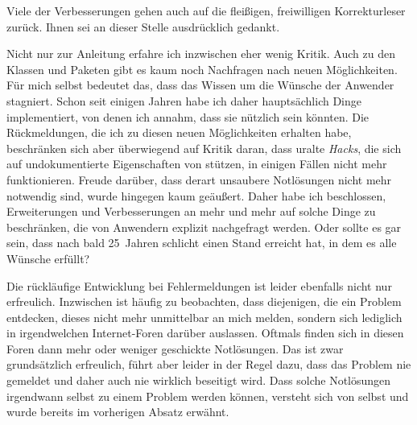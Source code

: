Viele der Verbesserungen gehen auch auf die fleißigen, freiwilligen
Korrekturleser zurück. Ihnen sei an dieser Stelle ausdrücklich gedankt.


Nicht nur zur Anleitung erfahre ich inzwischen eher wenig Kritik. Auch zu den
Klassen und Paketen gibt es kaum noch Nachfragen nach neuen Möglichkeiten. Für
mich selbst bedeutet das, dass das Wissen um die Wünsche der Anwender
stagniert. Schon seit einigen Jahren habe ich daher hauptsächlich Dinge
implementiert, von denen ich annahm, dass sie nützlich sein könnten. Die
Rückmeldungen, die ich zu diesen neuen Möglichkeiten erhalten habe,
beschränken sich aber überwiegend auf Kritik daran, dass uralte \emph{Hacks},
die sich auf undokumentierte Eigenschaften von \KOMAScript{} stützen, in
einigen Fällen nicht mehr funktionieren. Freude darüber, dass derart unsaubere
Notlösungen nicht mehr notwendig sind, wurde hingegen kaum geäußert. Daher
habe ich beschlossen, Erweiterungen und Verbesserungen an \KOMAScript{} mehr
und mehr auf solche Dinge zu beschränken, die von Anwendern explizit
nachgefragt werden. Oder sollte es gar sein, dass \KOMAScript{} nach bald
25~Jahren schlicht einen Stand erreicht hat, in dem es alle Wünsche erfüllt?

Die rückläufige Entwicklung bei Fehlermeldungen ist leider ebenfalls nicht nur
erfreulich. Inzwischen ist häufig zu beobachten, dass diejenigen, die ein
Problem entdecken, dieses nicht mehr unmittelbar an mich melden, sondern sich
lediglich in irgendwelchen Internet-Foren darüber auslassen. Oftmals finden
sich in diesen Foren dann mehr oder weniger geschickte Notlösungen. Das ist
zwar grundsätzlich erfreulich, führt aber leider in der Regel dazu, dass das
Problem nie gemeldet und daher auch nie wirklich beseitigt wird. Dass solche
Notlösungen irgendwann selbst zu einem Problem werden können, versteht sich
von selbst und wurde bereits im vorherigen Absatz erwähnt.

